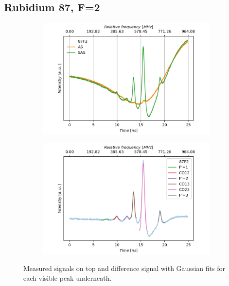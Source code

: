 \documentclass[]{article}
\begin{document}
\subsection{Rubidium 87, F=2}
\begin{figure}[H]
\centering
\begin{subfigure}{.7\textwidth}
\includegraphics[width=\linewidth]{Plots/87F2_Both.png}
\end{subfigure}

\begin{subfigure}[c]{.7\textwidth}
\includegraphics[width=\linewidth]{Plots/87F2_Diff.png}
\end{subfigure}
\caption{Measured signals on top and difference signal with Gaussian fits for each visible peak underneath.}
\label{fig: 87F2}
\end{figure}

\end{document}
